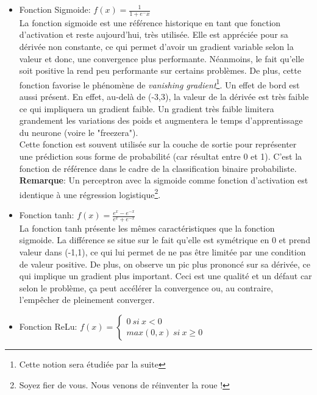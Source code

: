 \begin{itemize}
    \item Fonction Sigmoide: $f(x)=\frac{1}{1+e^-x}$\\

    La fonction sigmoide est une référence historique en tant que fonction d'activation et reste aujourd'hui, très utilisée. Elle est appréciée pour sa dérivée non constante, ce qui permet d'avoir un gradient variable selon la valeur et donc, une convergence plus performante. Néanmoins, le fait qu'elle soit positive la rend peu performante sur certains problèmes. De plus, cette fonction favorise le phénomène de \textit{vanishing gradient}\footnote{Cette notion sera étudiée par la suite}. Un effet de bord est aussi présent. En effet, au-delà de (-3,3), la valeur de la dérivée est très faible ce qui impliquera un gradient faible. Un gradient très faible limitera grandement les variations des poids et augmentera le temps d'apprentissage du neurone (voire le "freezera").\\

    Cette fonction est souvent utilisée sur la couche de sortie pour représenter une prédiction sous forme de probabilité (car résultat entre 0 et 1). C'est la fonction de référence dans le cadre de la classification binaire probabiliste.\\

    \textbf{Remarque}: Un perceptron avec la sigmoide comme fonction d'activation est identique à une régression logistique\footnote{Soyez fier de vous. Nous venons de réinventer la roue !}.

    \item Fonction tanh: $f(x) =\frac{e^x-e^{-x}}{e^x+e^{-x}}$\\

    La fonction tanh présente les mêmes caractéristiques que la fonction sigmoide. La différence se situe sur le fait qu'elle est symétrique en 0 et prend valeur dans (-1,1), ce qui lui permet de ne pas être limitée par une condition de valeur positive. De plus, on observe un pic plus prononcé sur sa dérivée, ce qui implique un gradient plus important. Ceci est une qualité et un défaut car selon le problème, ça peut accélérer la convergence ou, au contraire, l'empêcher de pleinement converger.

    \item Fonction ReLu: $f(x)=\left\{\begin{array}{ll}0 \ si \ x<0 \\max(0,x) \ si \ x\geq 0\end{array}\right.$\\


\end{itemize}
